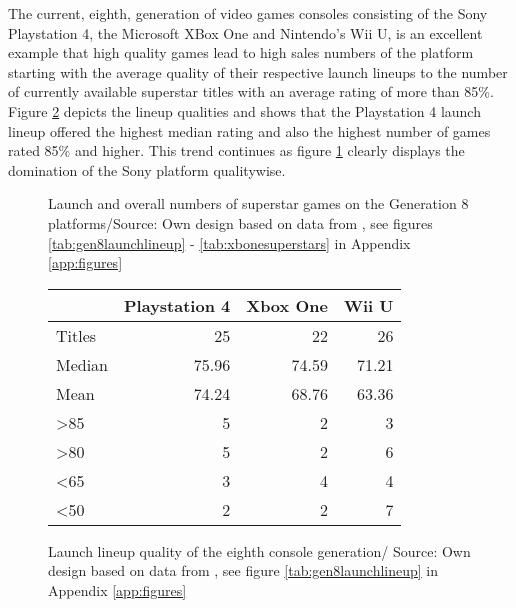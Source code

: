 \documentclass
[
    a4paper,
    11pt
]
{article}
\begin{document}
The current, eighth, generation of video games consoles consisting of the Sony Playstation 4, the Microsoft XBox One and Nintendo's Wii U, is an excellent example that high quality games lead to high sales numbers of the platform starting with the average quality of their respective launch lineups to the number of currently available superstar titles with an average rating of more than 85\%. Figure \ref{tab:gen8launchquality} depicts the lineup qualities and shows that the Playstation 4 launch lineup offered the highest median rating and also the highest number of games rated 85\% and higher. This trend continues as figure \ref{fig:gen8quality} clearly displays the domination of the Sony platform qualitywise.
%
\renewcommand{\bcfontstyle}{}
\begin{figure}[ht!]
    \centering
		\begin{bchart}[step=5,max=45,width=10cm]
			\smallskip
			\smallskip
			\smallskip
		\end{bchart}
    \caption{Launch and overall numbers of superstar games on the Generation 8 platforms/Source: Own design based on data from \cite{Gamerankings2016}, see figures \ref{tab:gen8launchlineup} - \ref{tab:xbonesuperstars} in Appendix \ref{app:figures}}
    \label{fig:gen8quality}
\end{figure}
%
\begin{figure}[h]
    \centering
    \small
    \begin{tabular}{l r r r}
      \hline
                        & Playstation 4 & Xbox One  & Wii U \\ \hline \hline
            Titles      & 25            & 22        & 26    \\
            Median      & 75.96         & 74.59     & 71.21 \\
            Mean        & 74.24         & 68.76     & 63.36 \\
    \textgreater 85     & 5             & 2         & 3     \\
    \textgreater 80     & 5             & 2         & 6     \\
    \textless 65        & 3             & 4         & 4     \\
    \textless 50        & 2             & 2         & 7     \\ \hline
    \end{tabular}
    \caption{Launch lineup quality of the eighth console generation/ Source: Own design based on data from \cite{Gamerankings2016}, see figure \ref{tab:gen8launchlineup} in Appendix \ref{app:figures}}
    \label{tab:gen8launchquality}
\end{figure}
\end{document}
